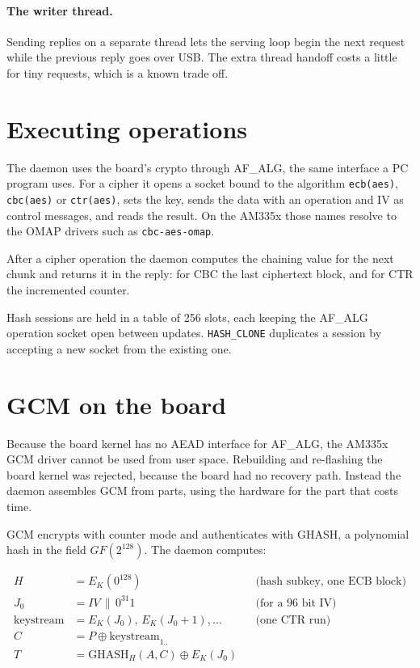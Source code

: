 \documentclass[11pt,a4paper,oneside]{report}
\newcommand{\code}[1]{\texttt{\small #1}}
\begin{document}
\paragraph{The writer thread.} Sending replies on a separate thread lets the serving loop begin the next request while the previous reply goes over USB. The extra thread handoff costs a little for tiny requests, which is a known trade off.

\section{Executing operations}

The daemon uses the board's crypto through AF\_ALG, the same interface a PC program uses. For a cipher it opens a socket bound to the algorithm \code{ecb(aes)}, \code{cbc(aes)} or \code{ctr(aes)}, sets the key, sends the data with an operation and IV as control messages, and reads the result. On the AM335x those names resolve to the OMAP drivers such as \code{cbc-aes-omap}.

After a cipher operation the daemon computes the chaining value for the next chunk and returns it in the reply: for CBC the last ciphertext block, and for CTR the incremented counter.

Hash sessions are held in a table of 256 slots, each keeping the AF\_ALG operation socket open between updates. \code{HASH\_CLONE} duplicates a session by accepting a new socket from the existing one.

\section{GCM on the board}\label{sec:gcmboard}

Because the board kernel has no AEAD interface for AF\_ALG, the AM335x GCM driver cannot be used from user space. Rebuilding and re-flashing the board kernel was rejected, because the board had no recovery path. Instead the daemon assembles GCM from parts, using the hardware for the part that costs time.

GCM encrypts with counter mode and authenticates with GHASH, a polynomial hash in the field $GF(2^{128})$. The daemon computes:

\begin{align*}
H &= E_K(0^{128}) &&\text{(hash subkey, one ECB block)}\\
J_0 &= IV \,\|\, 0^{31}1 &&\text{(for a 96 bit IV)}\\
\text{keystream} &= E_K(J_0),\, E_K(J_0+1),\ldots &&\text{(one CTR run)}\\
C &= P \oplus \text{keystream}_{1..}\\
T &= \text{GHASH}_H(A, C) \oplus E_K(J_0)
\end{align*}
\end{document}
